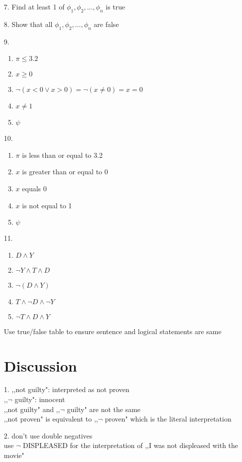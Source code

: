 \documentclass[11pt]{exam}
\begin{document}
\begin{enumerate}[leftmargin=0pt]
\item[7.] Find at least 1 of $\phi_1, \phi_2, ..., \phi_n$ is true

\item[8.] Show that all $\phi_1, \phi_2, ..., \phi_n$ are false

\item[9.]
\begin{enumerate}[label=(\alph*)]
    \item $\pi \leq 3.2$
    \item $x \geq 0$
    \item $\neg(x < 0 \lor x > 0) = \neg(x \neq 0) = x = 0$
    \item $x \neq 1$
    \item $\psi$
\end{enumerate}

\item[10.] 
\begin{enumerate}[label=(\alph*)]
    \item $\pi$ is less than or equal to 3.2
    \item $x$ is greater than or equal to 0
    \item $x$ equals 0
    \item $x$ is not equal to 1
    \item $\psi$
\end{enumerate}

\item[11.]
\begin{enumerate}[label=(\alph*)]
    \item $D \land Y$
    \item $\neg Y \land T \land D$
    \item $\neg(D \land Y)$
    \item $T \land \neg D \land \neg Y$
    \item $\neg T \land D \land Y$
\end{enumerate}
Use true/false table to ensure sentence and logical statements are same

\section{Discussion}
\item[1.] ,,not guilty": interpreted as not proven \\
,,$\neg$ guilty": innocent \\
,,not guilty" and ,,$\neg$ guilty" are not the same \\
,,not proven" is equivalent to ,,$\neg$ proven" which is the literal interpretation

\item[2.] don't use double negatives \\
use $\neg$ DISPLEASED for the interpretation of ,,I was not displeased with the movie"


\end{enumerate}
\end{document}

